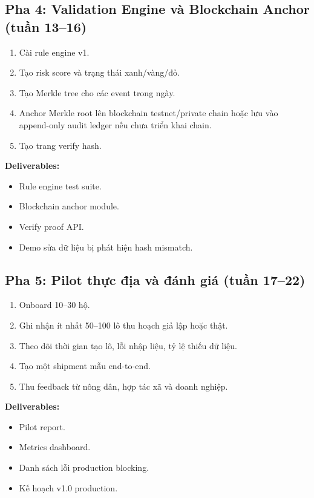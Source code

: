 \documentclass[12pt,a4paper]{article}
\begin{document}
\subsection{Pha 4: Validation Engine và Blockchain Anchor (tuần 13--16)}

\begin{enumerate}[leftmargin=2em]
    \item Cài rule engine v1.
    \item Tạo risk score và trạng thái xanh/vàng/đỏ.
    \item Tạo Merkle tree cho các event trong ngày.
    \item Anchor Merkle root lên blockchain testnet/private chain hoặc lưu vào append-only audit ledger nếu chưa triển khai chain.
    \item Tạo trang verify hash.
\end{enumerate}

\textbf{Deliverables:}
\begin{itemize}[leftmargin=2em]
    \item Rule engine test suite.
    \item Blockchain anchor module.
    \item Verify proof API.
    \item Demo sửa dữ liệu bị phát hiện hash mismatch.
\end{itemize}

\subsection{Pha 5: Pilot thực địa và đánh giá (tuần 17--22)}

\begin{enumerate}[leftmargin=2em]
    \item Onboard 10--30 hộ.
    \item Ghi nhận ít nhất 50--100 lô thu hoạch giả lập hoặc thật.
    \item Theo dõi thời gian tạo lô, lỗi nhập liệu, tỷ lệ thiếu dữ liệu.
    \item Tạo một shipment mẫu end-to-end.
    \item Thu feedback từ nông dân, hợp tác xã và doanh nghiệp.
\end{enumerate}

\textbf{Deliverables:}
\begin{itemize}[leftmargin=2em]
    \item Pilot report.
    \item Metrics dashboard.
    \item Danh sách lỗi production blocking.
    \item Kế hoạch v1.0 production.
\end{itemize}
\end{document}
